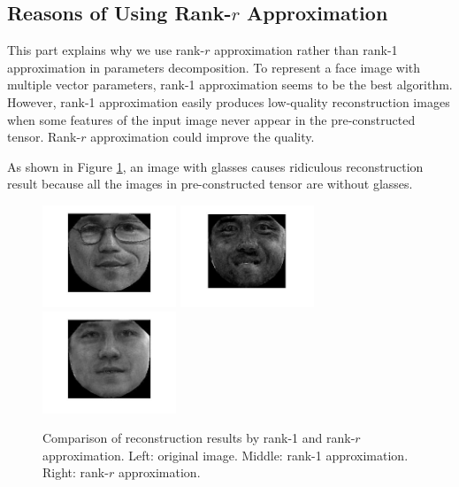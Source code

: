 \subsection{Reasons of Using Rank-$r$ Approximation}
    This part explains why we use rank-$r$ approximation rather than rank-1 approximation in
    parameters decomposition. 
    To represent a face image with multiple vector parameters, rank-1 approximation seems to be the best
    algorithm. 
    However, rank-1 approximation easily produces low-quality reconstruction images 
    when some features of the input image never appear in the pre-constructed tensor.
    Rank-$r$ approximation could improve the quality.

    As shown in Figure \ref{fig:glass}, an image with glasses causes ridiculous reconstruction result because
    all the images in pre-constructed tensor are without glasses.

    \begin{figure}[!htb]
      \centering
      \includegraphics[width=40mm]{figure/untrain}
      \includegraphics[width=40mm]{figure/untrain-rank1}
      \includegraphics[width=40mm]{figure/untrain-a}

      \caption{Comparison of reconstruction results by rank-1 and rank-$r$ approximation. 
      Left: original image. Middle: rank-1 approximation. Right: rank-$r$ approximation.} %
      \label{fig:glass}
    \end{figure}


